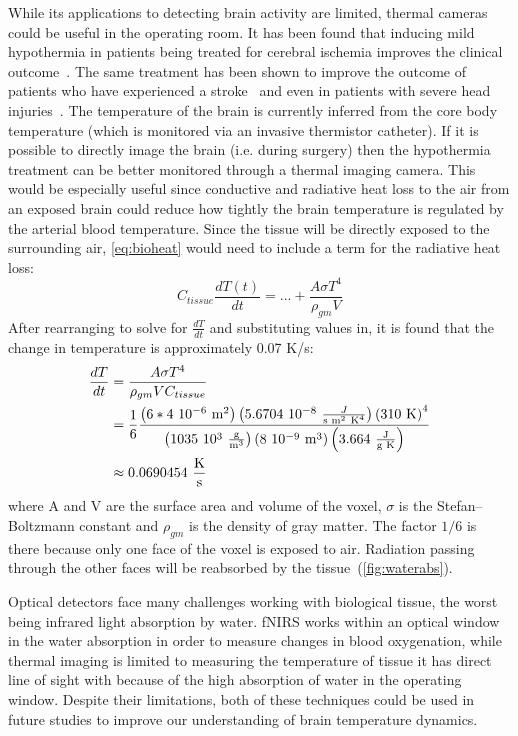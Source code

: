 While its applications to detecting brain activity are limited, thermal cameras could be useful in the operating room.  It has been found that inducing mild hypothermia in patients being treated for cerebral ischemia improves the clinical outcome~\citep{maher1993}. The same treatment has been shown to improve the outcome of patients who have experienced a stroke~\citep{krieger2001} and even in patients with severe head injuries~\citep{soukup2002}. The temperature of the brain is currently inferred from the core body temperature (which is monitored via an invasive thermistor catheter). If it is possible to directly image the brain (i.e. during surgery) then the hypothermia treatment can be better monitored through a thermal imaging camera.  This would be especially useful since conductive and radiative heat loss to the air from an exposed brain could reduce how tightly the brain temperature is regulated by the arterial blood temperature.  Since the tissue will be directly exposed to the surrounding air, \cref{eq:bioheat} would need to include a term for the radiative heat loss:
\begin{equation}
  C_{tissue} \frac{dT(t)}{dt} = ... +\frac{A \sigma T^4}{\rho_{gm} V}
\end{equation}
After rearranging to solve for $\frac{dT}{dt}$ and substituting values in, it is found that the change in temperature is approximately 0.07 K/s:
\begin{align}
  \frac{dT}{dt} &= \frac{A \sigma T^{4}}{\rho_{gm} V C_{tissue}}\nonumber\\
  & {} = \frac{1}{6}%
  \frac{%
    \left(6*4\ 10^{-6}\ \text{m}^{2}\right)%
    \left(5.6704\ 10^{-8}\ \frac{J}{\text{s m}^{2}\ \text{K}^{4}}\right)%
    \left(310\ \text{K}\right)^{4}}%
  { \left(1035\ 10^3\ \frac{\text{g}}{\text{m}^{3}}\right)%
    \left(8\ 10^{-9}\ \text{m}^3\right)%
    \left(3.664\ \frac{\text{J}}{\text{g K}}\right)}\nonumber\\
  & {} \approx 0.0690454\ \frac{\text{K}}{\text{s}}
\end{align}
where A and V are the surface area and volume of the voxel, $\sigma$ is the Stefan–Boltzmann constant and $\rho_{gm}$ is the density of gray matter.  The factor $1/6$ is there because only one face of the voxel is exposed to air.  Radiation passing through the other faces will be reabsorbed by the tissue~(\cref{fig:waterabs}).

Optical detectors face many challenges working with biological tissue, the worst being infrared light absorption by water. fNIRS works within an optical window in the water absorption in order to measure changes in blood oxygenation, while thermal imaging is limited to measuring the temperature of tissue it has direct line of sight with because of the high absorption of water in the operating window. Despite their limitations, both of these techniques could be used in future studies to improve our understanding of brain temperature dynamics.